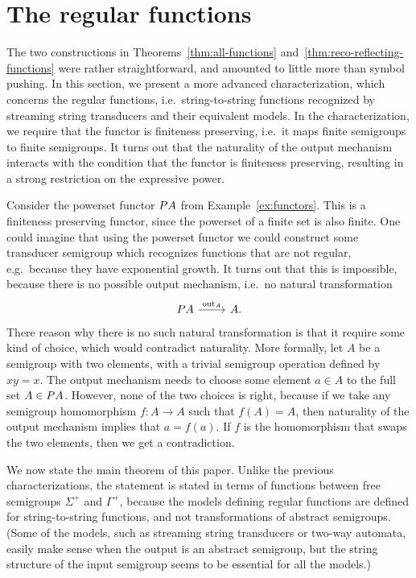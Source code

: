 

\section{The regular functions}
\label{sec:reg-char}
The two constructions in Theorems~\ref{thm:all-functions} and~\ref{thm:reco-reflecting-functions} were rather straightforward, and amounted to little more than symbol pushing. In this section, we present a more advanced  characterization, which concerns  the regular functions, i.e.~string-to-string functions recognized by streaming string transducers and their equivalent models. In the characterization, we require that the functor is finiteness preserving, i.e.~it maps finite semigroups to finite semigroups. It turns out that the naturality of the output mechanism interacts with the condition that 
the functor is finiteness preserving, resulting in a strong restriction on the expressive power.

\begin{example}
    Consider the powerset functor $\powerset A$ from Example~\ref{ex:functors}. This is a finiteness preserving functor, since the powerset of a finite set is also finite. One could imagine that using the powerset functor we could construct some transducer semigroup which recognizes functions that are not regular, e.g.~because they have exponential growth. It turns out that this is impossible, because there is no possible output mechanism, i.e.~no natural transformation 
    \[
    \begin{tikzcd}
    \powerset A 
    \ar[r,"\outfun_A"]
    &
    A.
    \end{tikzcd}
    \]
    There reason why there is no such natural transformation is that it require some kind of choice, which would contradict naturality. More formally, let $A$ be a semigroup with two elements, with a trivial semigroup operation defined by $xy=x$. The output mechanism needs to choose some element $a \in A$ to the full set $A \in \powerset A$. However, none of the two choices is right, because if we take any semigroup homomorphism $f : A \to A$ such that $f(A)=A$, then  naturality of the output mechanism implies that $a=f(a)$. If $f$ is the homomorphism that swaps the two elements, then we get a contradiction.
\end{example}


We now state the main theorem of this paper. Unlike the previous characterizations, the statement is stated in terms of functions between free semigroups $\Sigma^+$ and $\Gamma^+$, because the models defining regular functions are defined for string-to-string functions, and not transformations of abstract semigroups. (Some of the models, such as streaming string transducers or two-way automata, easily make sense when the output is an abstract semigroup, but the string structure of the input semigroup seems to be essential for all the models.) 

